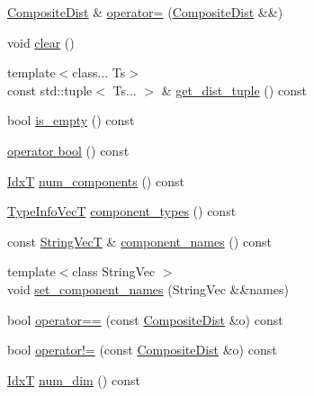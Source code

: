 \begin{DoxyCompactItemize}
\item 
\hyperlink{classprior__hessian_1_1CompositeDist}{Composite\+Dist} \& \hyperlink{classprior__hessian_1_1CompositeDist_a43e7e3e64b7cfa61fdfecc00dc6b0892}{operator=} (\hyperlink{classprior__hessian_1_1CompositeDist}{Composite\+Dist} \&\&)
\item 
void \hyperlink{classprior__hessian_1_1CompositeDist_abb88cadec39226df790848e811928021}{clear} ()
\item 
{\footnotesize template$<$class... Ts$>$ }\\const std\+::tuple$<$ Ts... $>$ \& \hyperlink{classprior__hessian_1_1CompositeDist_a6c7455474c3ffd782329ad3bafb2b710}{get\+\_\+dist\+\_\+tuple} () const 
\item 
bool \hyperlink{classprior__hessian_1_1CompositeDist_a56d7b1a0e8195d369cc99c7c2d4d392f}{is\+\_\+empty} () const 
\item 
\hyperlink{classprior__hessian_1_1CompositeDist_ae5125cf951624e169436c71d01a11783}{operator bool} () const 
\item 
\hyperlink{namespaceprior__hessian_aa8d589f74e88bfa3b5750118acd1ab78}{IdxT} \hyperlink{classprior__hessian_1_1CompositeDist_a6faf6fbb059017af5756d4327bb504bc}{num\+\_\+components} () const 
\item 
\hyperlink{namespaceprior__hessian_acfdf544db12888f88bafb2e671841352}{Type\+Info\+VecT} \hyperlink{classprior__hessian_1_1CompositeDist_ad796a4f6b17cc35f936dee7d7d9a9a43}{component\+\_\+types} () const 
\item 
const \hyperlink{namespaceprior__hessian_a61fc0176249462ee94fe3cca92cf3f8c}{String\+VecT} \& \hyperlink{classprior__hessian_1_1CompositeDist_a5f59bcbe24d659084fbe3dc188011779}{component\+\_\+names} () const 
\item 
{\footnotesize template$<$class String\+Vec $>$ }\\void \hyperlink{classprior__hessian_1_1CompositeDist_aa2a230c7e878eae70cb347321a95a7f3}{set\+\_\+component\+\_\+names} (String\+Vec \&\&names)
\item 
bool \hyperlink{classprior__hessian_1_1CompositeDist_a4928ff87d363bf6c4a650fdebfe301be}{operator==} (const \hyperlink{classprior__hessian_1_1CompositeDist}{Composite\+Dist} \&o) const 
\item 
bool \hyperlink{classprior__hessian_1_1CompositeDist_a250487f51401fa1d367e5ef5eb92c072}{operator!=} (const \hyperlink{classprior__hessian_1_1CompositeDist}{Composite\+Dist} \&o) const 
\item 
\hyperlink{namespaceprior__hessian_aa8d589f74e88bfa3b5750118acd1ab78}{IdxT} \hyperlink{classprior__hessian_1_1CompositeDist_ad532e3fe9e7293fef7b293d3c94a1ddc}{num\+\_\+dim} () const 

\end{DoxyCompactItemize}
